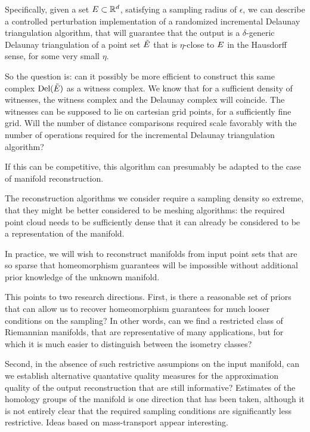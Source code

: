 Specifically, given a set $E \subset \mathbb{R}^d$, satisfying a sampling
radius of $\epsilon$, we can describe a
controlled perturbation implementation of a randomized incremental
Delaunay triangulation algorithm, that will guarantee that the output
is a $\delta$-generic Delaunay triangulation of a point set
$\tilde{E}$ that is $\eta$-close to $E$ in the Hausdorff sense,
for some very small $\eta$. 

So the question is: can it possibly be more efficient to construct
this same complex $\text{Del}(\tilde{E})$ as a witness complex. We
know that for a sufficient density of witnesses, the witness complex
and the Delaunay complex will coincide. The witnesses can be supposed
to lie on cartesian grid points, for a sufficiently fine grid. Will
the number of distance comparisons required scale favorably with the
number of operations required for the incremental Delaunay
triangulation algorithm?

If this can be competitive, this algorithm can presumably be adapted
to the case of manifold reconstruction.

%

The reconstruction algorithms we consider require a sampling density
so extreme, that they might be better considered to be meshing
algorithms: the required point cloud needs to be sufficiently dense
that it can already be considered to be a representation of the
manifold.

In practice, we will wish to reconstruct manifolds from input point
sets that are so sparse that homeomorphism guarantees will be
impossible without additional prior knowledge of the unknown
manifold. 

This points to two research directions. First, is there a reasonable
set of priors that can allow us to recover homeomorphism guarantees
for much looser conditions on the sampling? In other words, can we
find a restricted class of Riemannian manifolds, that are
representative of many applications, but for which it is much easier
to distinguish between the isometry classes?

Second, in the absence of such restrictive assumpions on the input
manifold, can we establish alternative quantative quality measures for
the approximation quality of the output reconstruction that are still
informative? Estimates of the homology groups of the manifold is one
direction that has been taken, although it is not entirely clear that
the required sampling conditions are significantly less
restrictive. Ideas based on mass-transport appear interesting.
